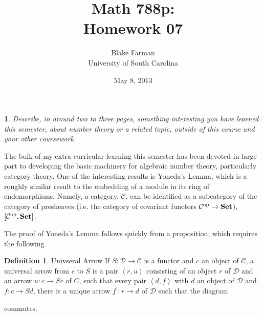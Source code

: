 \documentclass[10pt]{amsart}
\author{Blake Farman\\University of South Carolina}
\title{Math 788p:\\Homework 07}
\date{May 8, 2013}
\begin{document}
\maketitle

\providecommand{\p}{\mathfrak{p}}
\providecommand{\m}{\mathfrak{m}}
\newcommand{\legendre}[2]{\left(\frac{#1}{#2}\right)}
\theoremstyle{plain}
\newtheorem{thm}{}
\newtheorem{lem}{Lemma}
\theoremstyle{definition}
\newtheorem{defn}{Definition}
\newtheorem{prop}{Proposition}
\newtheorem{cor}{Corollary}

\setcounter{thm}{6}

\begin{thm}
  Describe, in around two to three pages, something interesting you have learned this semester, about number theory or a related topic, outside of this course and your other coursework.
\end{thm}

The bulk of my extra-curricular learning this semester has been devoted in large part to developing the basic machinery for algebraic number theory, particularly category theory.  
One of the interesting results is Yoneda's Lemma, which is a roughly similar result to the embedding of a module in its ring of endomorphisms.  
Namely, a category, $\mathcal{C}$, can be identified as a subcategory of the category of presheaves (i.e. the category of covariant functors $\mathcal{C}^\text{op} \rightarrow {\bf Set}$), $[\mathcal{C}^\text{op}, {\bf Set}]$.

The proof of Yoneda's Lemma follows quickly from a proposition, which requires the following
\begin{defn}{Univseral Arrow}
  If $S: \mathcal{D} \rightarrow \mathcal{C}$ is a functor and $c$ an object of $\mathcal{C}$, a universal arrow from $c$ to $S$ is a pair $\left<r, u\right>$ consisting of an object $r$ of $\mathcal{D}$ and an arrow $u \colon c \rightarrow Sr$ of $C$, such that every pair $\left<d,f\right>$ with $d$ an object of $\mathcal{D}$ and $f \colon c \rightarrow Sd$, there is a unique arrow $f^\prime \colon r \rightarrow d$ of $\mathcal{D}$ such that the diagram
  \begin{center}
  \end{center}
  commutes.
\end{defn}
\end{document}
